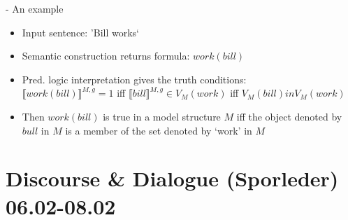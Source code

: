 \documentclass[11pt]{article}
\newenvironment{itemise}{
\begin{itemize}
  \setlength{\itemsep}{1pt}
  \setlength{\parskip}{0pt}
  \setlength{\parsep}{0pt}
}{\end{itemize}}
\begin{document}
- An example
\begin{itemise}
 \item Input sentence: 'Bill works`
 \item Semantic construction returns formula: $work(bill)$
 \item Pred. logic interpretation gives the truth conditions: \\$\llbracket work(bill)\rrbracket^{M,g} = 1$ iff $\llbracket bill\rrbracket^{M,g} \in V_M (work)$ iff $V_M (bill) in V_M(work)$
 \item Then $work(bill)$ is true in a model structure $M$ iff the object denoted by $bull$ in $M$ is a member of the set denoted by `work' in $M$
\end{itemise}

\newpage\section{Discourse \& Dialogue (Sporleder) 06.02-08.02}
\end{document}
